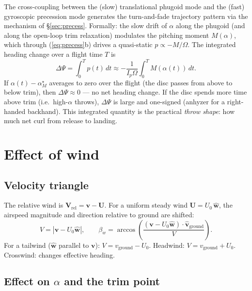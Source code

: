 \documentclass[11pt,letterpaper]{article}
\begin{document}
The cross-coupling between the (slow) translational phugoid mode and the (fast) gyroscopic precession mode generates the turn-and-fade trajectory pattern via the mechanism of \S\ref{sec:precess}. Formally: the slow drift of $\alpha$ along the phugoid (and along the open-loop trim relaxation) modulates the pitching moment $M(\alpha)$, which through (\ref{eq:precess}b) drives a quasi-static $p \propto -M/\Omega$. The integrated heading change over a flight time $T$ is
\begin{equation}
\Delta\Psi = \int_0^T p(t)\,dt \approx -\frac{1}{I_p \Omega} \int_0^T M(\alpha(t))\,dt.
\label{eq:dpsi}
\end{equation}
If $\alpha(t) - \alpha_M^\star$ averages to zero over the flight (the disc passes from above to below trim), then $\Delta\Psi \approx 0$ --- no net heading change. If the disc spends more time above trim (i.e.\ high-$\alpha$ throws), $\Delta\Psi$ is large and one-signed (anhyzer for a right-handed backhand). This integrated quantity is the practical \emph{throw shape}: how much net curl from release to landing.

\section{Effect of wind}
\label{sec:wind}

\subsection{Velocity triangle}

The relative wind is $\mathbf{V}_{\text{rel}} = \mathbf{v} - \mathbf{U}$. For a uniform steady wind $\mathbf{U} = U_0\,\hat{\mathbf{w}}$, the airspeed magnitude and direction relative to ground are shifted:
\begin{equation}
V = |\mathbf{v} - U_0\hat{\mathbf{w}}|, \qquad \beta_w = \arccos\!\left(\frac{(\mathbf{v} - U_0\hat{\mathbf{w}})\cdot \hat{\mathbf{v}}_{\text{ground}}}{V}\right).
\end{equation}
For a tailwind ($\hat{\mathbf{w}}$ parallel to $\mathbf{v}$): $V = v_{\text{ground}} - U_0$. Headwind: $V = v_{\text{ground}} + U_0$. Crosswind: changes effective heading.

\subsection{Effect on $\alpha$ and the trim point}
\end{document}
